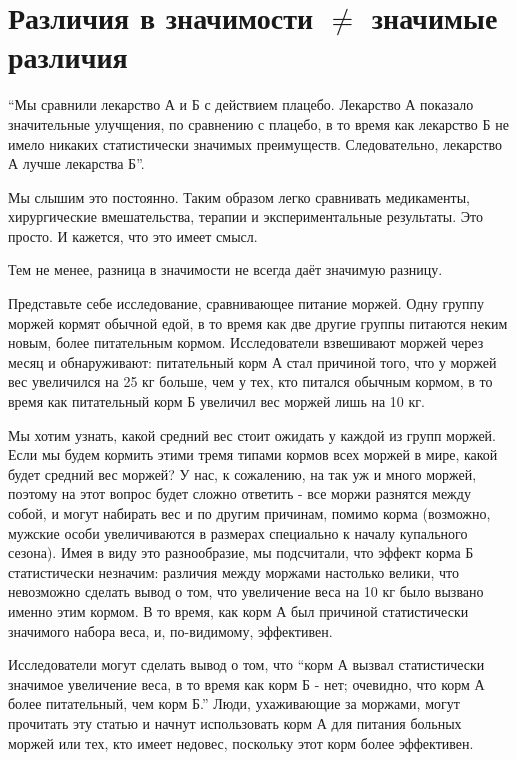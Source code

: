 \chapter{Различия в значимости $\neq$ значимые различия}
\label{chp6}

``Мы сравнили лекарство А и Б с действием плацебо. Лекарство А показало значительные улучщения, по сравнению с плацебо, в то время как лекарство Б не имело никаких статистически значимых преимуществ. Следовательно, лекарство А лучше лекарства Б''.

Мы слышим это постоянно. Таким образом легко сравнивать медикаменты, хирургические вмешательства, терапии и экспериментальные результаты. Это просто. И кажется, что это имеет смысл.

Тем не менее, разница в значимости не всегда даёт значимую разницу. \cite{gelman_difference_2006}

Представьте себе исследование, сравнивающее питание моржей. Одну группу моржей кормят обычной едой, в то время как две другие группы питаются неким новым, более питательным кормом. Исследователи взвешивают моржей через месяц и обнаруживают: питательный корм А стал причиной того, что у моржей вес увеличился на 25 кг больше, чем у тех, кто питался обычным кормом, в то время как питательный корм Б увеличил вес моржей лишь на 10 кг. 

Мы хотим узнать, какой средний вес стоит ожидать у каждой из групп моржей. Если мы будем кормить этими тремя типами кормов всех моржей в мире, какой будет средний вес моржей? У нас, к сожалению, на так уж и много моржей, поэтому на этот вопрос будет сложно ответить - все моржи разнятся между собой, и могут набирать вес и по другим причинам, помимо корма (возможно, мужские особи увеличиваются в размерах специально к началу купального сезона). Имея в виду это разнообразие, мы подсчитали, что эффект корма Б статистически незначим: различия между моржами настолько велики, что невозможно сделать вывод о том, что увеличение веса на 10 кг было вызвано именно этим кормом. В то время, как корм А был причиной статистически значимого набора веса, и, по-видимому, эффективен. 

Исследователи могут сделать вывод о том, что ``корм А вызвал статистически значимое увеличение веса, в то время как корм Б - нет; очевидно, что корм А более питательный, чем корм Б.'' Люди, ухаживающие за моржами, могут прочитать эту статью и начнут использовать корм А для питания больных моржей или тех, кто имеет недовес, поскольку этот корм более эффективен.

